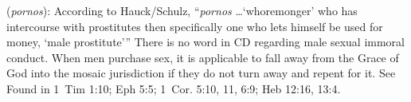 \item[Male-sex-buyer,]

(\textit{pornos}):
According to Hauck/Schulz, ``\emph{pornos} \ldots `whoremonger' who has intercourse with prostitutes then specifically one who lets himself be used for money, `male prostitute'''
There is no word in CD regarding male sexual immoral conduct. When men purchase sex, it is applicable to fall away from the Grace of God into the mosaic jurisdiction if they do not turn away and repent for it. See 
Found in 1~Tim 1:10; Eph 5:5; 1~Cor. 5:10, 11, 6:9; Heb 12:16, 13:4.
